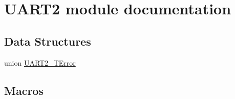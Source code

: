 \hypertarget{group___u_a_r_t2__module}{}\section{U\+A\+R\+T2 module documentation}
\label{group___u_a_r_t2__module}
\subsection*{Data Structures}
\begin{DoxyCompactItemize}
\item 
union \hyperlink{union_u_a_r_t2___t_error}{U\+A\+R\+T2\+\_\+\+T\+Error}
\end{DoxyCompactItemize}
\subsection*{Macros}
